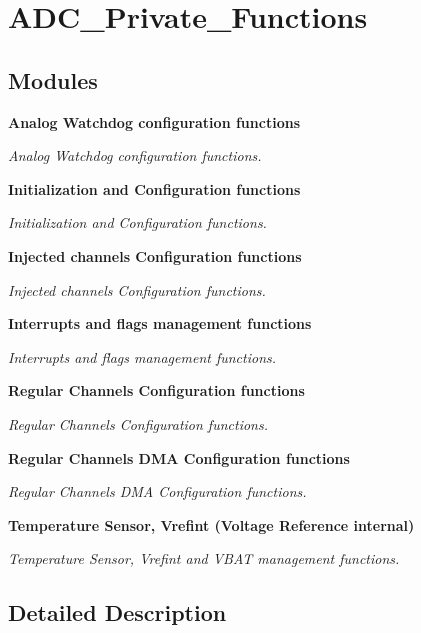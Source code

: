 \section{A\+D\+C\+\_\+\+Private\+\_\+\+Functions}
\label{group__ADC__Private__Functions}
\subsection*{Modules}
\begin{DoxyCompactItemize}
\item 
\textbf{ Analog Watchdog configuration functions}
\begin{DoxyCompactList}\small\item\em Analog Watchdog configuration functions. \end{DoxyCompactList}\item 
\textbf{ Initialization and Configuration functions}
\begin{DoxyCompactList}\small\item\em Initialization and Configuration functions. \end{DoxyCompactList}\item 
\textbf{ Injected channels Configuration functions}
\begin{DoxyCompactList}\small\item\em Injected channels Configuration functions. \end{DoxyCompactList}\item 
\textbf{ Interrupts and flags management functions}
\begin{DoxyCompactList}\small\item\em Interrupts and flags management functions. \end{DoxyCompactList}\item 
\textbf{ Regular Channels Configuration functions}
\begin{DoxyCompactList}\small\item\em Regular Channels Configuration functions. \end{DoxyCompactList}\item 
\textbf{ Regular Channels D\+M\+A Configuration functions}
\begin{DoxyCompactList}\small\item\em Regular Channels D\+MA Configuration functions. \end{DoxyCompactList}\item 
\textbf{ Temperature Sensor, Vrefint (\+Voltage Reference internal)}
\begin{DoxyCompactList}\small\item\em Temperature Sensor, Vrefint and V\+B\+AT management functions. \end{DoxyCompactList}\end{DoxyCompactItemize}


\subsection{Detailed Description}
